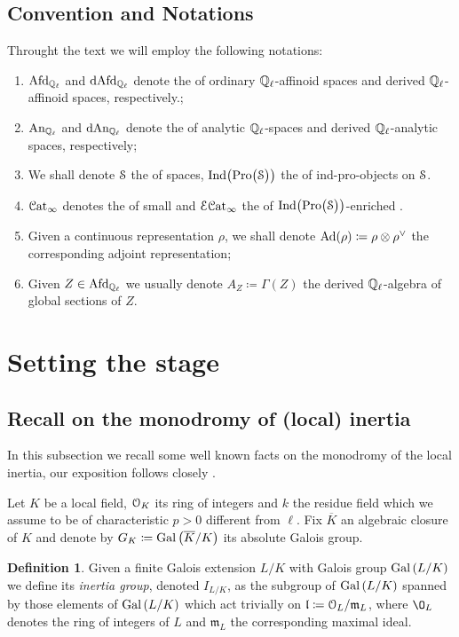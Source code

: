 \documentclass[10pt,a4paper]{amsart}
\numberwithin{equation}{subsection}
\theoremstyle{plain}
\theoremstyle{definition}
\newtheorem{defi}[theorem]{Definition}
\theoremstyle{remark}
\numberwithin{equation}{section}
\begin{document}
\subsection{Convention and Notations} Throught the text we will employ the following 
notations:

\begin{enumerate}
    \item $\mathrm{Afd}_{\mathbb{Q}_\ell}$ and $\mathrm{dAfd}_{\mathbb{Q}_\ell}$ denote the \infcats of ordinary $\mathbb{Q}_\ell$-affinoid spaces 
    and derived $\mathbb Q_\ell$-affinoid spaces, respectively.;
    \item $\mathrm{An}_{\mathbb{Q}_\ell}$ and $\mathrm{dAn}_{\mathbb{Q}_\ell}$ denote the \infcats of analytic $\mathbb Q_\ell$-spaces and derived
    $\mathbb Q_\ell$-analytic spaces, respectively;
    \item We shall denote $\mathcal S$ the \infcat of spaces, $\mathrm{Ind} \big( \mathrm{Pro} \big(\mathcal S \big)
    \big)$ the \infcat of ind-pro-objects on $\mathcal S$.
    \item $\mathcal{C}\mathrm{at}_\infty$ denotes the \infcat of small \infcats and $\mathcal E \mathcal{C}\mathrm{at}_\infty$ the \infcat
    of $\mathrm{Ind} \big( \mathrm{Pro} \big( \mathcal S \big) \big)$-enriched \infcats.
    \item Given a continuous representation $\rho$, we shall denote $\mathrm{Ad} ( \rho) \coloneqq
    \rho \otimes \rho^\vee$ the corresponding adjoint representation;
    \item Given $Z \in \mathrm{Afd}_{\mathbb{Q}_\ell}$ we usually denote $A_Z \coloneqq \Gamma(Z)$ the derived
    $\mathbb Q_\ell$-algebra of global sections of $Z$.
\end{enumerate} 


\section{Setting the stage}

\subsection{Recall on the monodromy of (local) inertia} In this subsection we recall some well known facts on the monodromy of the local inertia, our exposition follows closely \cite[\S 1.3]{fontaine_ouyang}.


Let $K$ be a local field, $\mathcal{O}_K$ its ring of integers and $k$ the residue field which we assume to be of characteristic $p>0$ different from $\ell$. Fix $\overline{K}$ an algebraic closure of $K$ and denote by $G_K \coloneqq
 \mathrm{Gal} \left( \overline{K} / K \right)$ its absolute Galois group.
 
 \begin{defi}
Given a finite Galois extension $L/K$ with Galois group $\mathrm{Gal} \left( L / K \right)$ we define its \emph{inertia group}, denoted $I_{L/K} $, as the subgroup of $\mathrm{Gal} \left( L / K \right)$
spanned by those elements of $\mathrm{Gal} \left( L /K \right)$ which act trivially on $\mathfrak l \coloneqq \mathcal{O}_L / \mathfrak{m}_L$, where $\O_L $ denotes the ring of integers of $L$ and $ \mathfrak{m}_L$ the corresponding maximal ideal. 
\end{defi}
\end{document}
